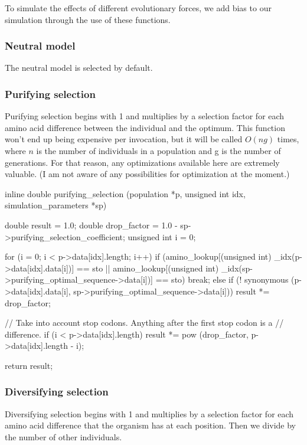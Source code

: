 \documentclass{article}
\begin{document}
      To simulate the effects of different evolutionary forces, we add bias to
      our simulation through the use of these functions.

      \subsubsection{Neutral model}

	The neutral model is selected by default.

      \subsubsection{Purifying selection}

	Purifying selection begins with 1 and multiplies by a selection factor
	for each amino acid difference between the individual and the optimum.
	This function won't end up being expensive per invocation, but it will
	be called $O(ng)$ times, where $n$ is the number of individuals in a
	population and g is the number of generations. For that reason, any
	optimizations available here are extremely valuable. (I am not aware of
	    any possibilities for optimization at the moment.)

\begin{ccode}
inline double purifying_selection (population *p, unsigned int idx, simulation_parameters *sp) {
  double	result          = 1.0;
  double	drop_factor     = 1.0 - sp->purifying_selection_coefficient;
  unsigned int	i            	= 0;

  for (i = 0; i < p->data[idx].length; i++)
    if (amino_lookup[(unsigned int) _idx(p->data[idx].data[i])] == sto ||
	amino_lookup[(unsigned int) _idx(sp->purifying_optimal_sequence->data[i])] == sto)
      break;
    else if (! synonymous (p->data[idx].data[i], sp->purifying_optimal_sequence->data[i]))
      result *= drop_factor;

  // Take into account stop codons. Anything after the first stop codon is a
  // difference.
  if (i < p->data[idx].length)
    result *= pow (drop_factor, p->data[idx].length - i);

  return result;
}
\end{ccode}

      \subsubsection{Diversifying selection}

	Diversifying selection begins with 1 and multiplies by a selection
	factor for each amino acid difference that the organism has at each
	position. Then we divide by the number of other individuals.
\end{document}
